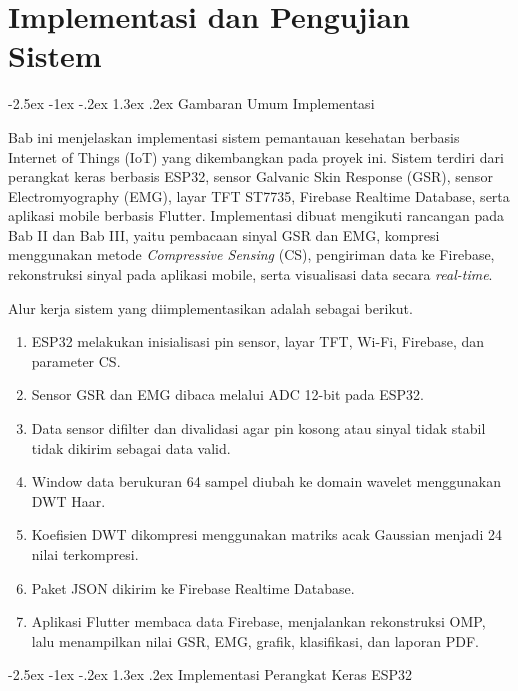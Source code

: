 \documentclass[12pt,a4paper]{report}
\makeatletter
\renewcommand{\section}{\@startsection{section}{1}{\z@}%
  {-2.5ex \@plus -1ex \@minus -.2ex}%
  {1.3ex \@plus .2ex}%
  {\normalfont\bfseries\fontsize{12}{14}\selectfont}}
\makeatother
\begin{document}
\renewcommand{\chaptername}{BAB}
\setcounter{chapter}{3}
\chapter{Implementasi dan Pengujian Sistem}

\section{Gambaran Umum Implementasi}

Bab ini menjelaskan implementasi sistem pemantauan kesehatan berbasis Internet of Things
(IoT) yang dikembangkan pada proyek ini. Sistem terdiri dari perangkat keras berbasis
ESP32, sensor Galvanic Skin Response (GSR), sensor Electromyography (EMG), layar TFT
ST7735, Firebase Realtime Database, serta aplikasi mobile berbasis Flutter. Implementasi
dibuat mengikuti rancangan pada Bab II dan Bab III, yaitu pembacaan sinyal GSR dan EMG,
kompresi menggunakan metode \textit{Compressive Sensing} (CS), pengiriman data ke
Firebase, rekonstruksi sinyal pada aplikasi mobile, serta visualisasi data secara
\textit{real-time}.

Alur kerja sistem yang diimplementasikan adalah sebagai berikut.

\begin{enumerate}
  \item ESP32 melakukan inisialisasi pin sensor, layar TFT, Wi-Fi, Firebase, dan parameter CS.
  \item Sensor GSR dan EMG dibaca melalui ADC 12-bit pada ESP32.
  \item Data sensor difilter dan divalidasi agar pin kosong atau sinyal tidak stabil tidak dikirim sebagai data valid.
  \item Window data berukuran 64 sampel diubah ke domain wavelet menggunakan DWT Haar.
  \item Koefisien DWT dikompresi menggunakan matriks acak Gaussian menjadi 24 nilai terkompresi.
  \item Paket JSON dikirim ke Firebase Realtime Database.
  \item Aplikasi Flutter membaca data Firebase, menjalankan rekonstruksi OMP, lalu menampilkan nilai GSR, EMG, grafik, klasifikasi, dan laporan PDF.
\end{enumerate}

\section{Implementasi Perangkat Keras ESP32}
\end{document}
